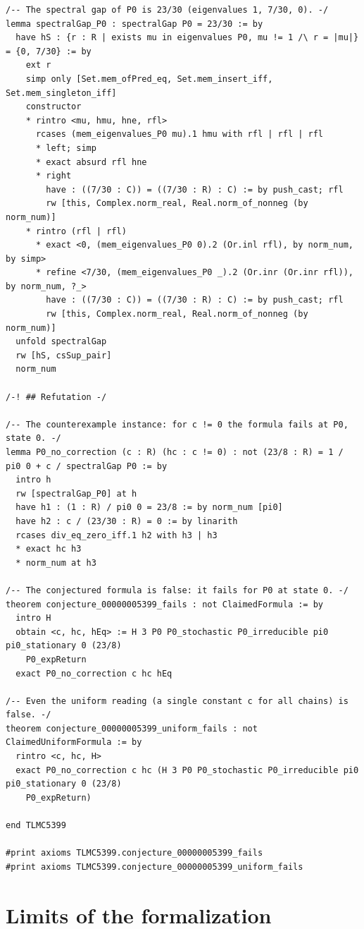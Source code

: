 \documentclass[11pt,a4paper]{article}
\begin{document}
\begin{lstlisting}[language={}]
/-- The spectral gap of P0 is 23/30 (eigenvalues 1, 7/30, 0). -/
lemma spectralGap_P0 : spectralGap P0 = 23/30 := by
  have hS : {r : R | exists mu in eigenvalues P0, mu != 1 /\ r = |mu|} = {0, 7/30} := by
    ext r
    simp only [Set.mem_ofPred_eq, Set.mem_insert_iff, Set.mem_singleton_iff]
    constructor
    * rintro <mu, hmu, hne, rfl>
      rcases (mem_eigenvalues_P0 mu).1 hmu with rfl | rfl | rfl
      * left; simp
      * exact absurd rfl hne
      * right
        have : ((7/30 : C)) = ((7/30 : R) : C) := by push_cast; rfl
        rw [this, Complex.norm_real, Real.norm_of_nonneg (by norm_num)]
    * rintro (rfl | rfl)
      * exact <0, (mem_eigenvalues_P0 0).2 (Or.inl rfl), by norm_num, by simp>
      * refine <7/30, (mem_eigenvalues_P0 _).2 (Or.inr (Or.inr rfl)), by norm_num, ?_>
        have : ((7/30 : C)) = ((7/30 : R) : C) := by push_cast; rfl
        rw [this, Complex.norm_real, Real.norm_of_nonneg (by norm_num)]
  unfold spectralGap
  rw [hS, csSup_pair]
  norm_num

/-! ## Refutation -/

/-- The counterexample instance: for c != 0 the formula fails at P0, state 0. -/
lemma P0_no_correction (c : R) (hc : c != 0) : not (23/8 : R) = 1 / pi0 0 + c / spectralGap P0 := by
  intro h
  rw [spectralGap_P0] at h
  have h1 : (1 : R) / pi0 0 = 23/8 := by norm_num [pi0]
  have h2 : c / (23/30 : R) = 0 := by linarith
  rcases div_eq_zero_iff.1 h2 with h3 | h3
  * exact hc h3
  * norm_num at h3

/-- The conjectured formula is false: it fails for P0 at state 0. -/
theorem conjecture_00000005399_fails : not ClaimedFormula := by
  intro H
  obtain <c, hc, hEq> := H 3 P0 P0_stochastic P0_irreducible pi0 pi0_stationary 0 (23/8)
    P0_expReturn
  exact P0_no_correction c hc hEq

/-- Even the uniform reading (a single constant c for all chains) is false. -/
theorem conjecture_00000005399_uniform_fails : not ClaimedUniformFormula := by
  rintro <c, hc, H>
  exact P0_no_correction c hc (H 3 P0 P0_stochastic P0_irreducible pi0 pi0_stationary 0 (23/8)
    P0_expReturn)

end TLMC5399

#print axioms TLMC5399.conjecture_00000005399_fails
#print axioms TLMC5399.conjecture_00000005399_uniform_fails
\end{lstlisting}

\section{Limits of the formalization}
\end{document}
